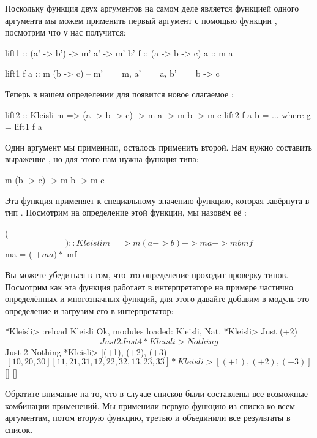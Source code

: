 Поскольку функция двух аргументов на самом деле является функцией одного
аргумента мы можем применить первый аргумент с помощью функции
, посмотрим что у нас получится:


\begin{code}
lift1       :: (a' -> b') -> m' a' -> m' b'
f           :: (a -> b -> c)
a           :: m a

lift1 f a   :: m (b -> c)  -- m' == m, a' == a, b' == b -> c
\end{code}

Теперь в нашем определении для  появится новое слагаемое
:


\begin{code}
lift2 :: Kleisli m => (a -> b -> c) -> m a -> m b -> m c
lift2 f a b = ...
    where g = lift1 f a
\end{code}

Один аргумент мы применили, осталось применить второй. Нам нужно
составить выражение , но для этого нам нужна функция типа:


\begin{code}
m (b -> c) -> m b -> m c
\end{code}

Эта функция применяет к специальному значению функцию, которая завёрнута
в тип . Посмотрим на определение этой функции, мы назовём её
\In{$$}:


\begin{code}
($$) :: Kleisli m => m (a -> b) -> m a -> m b
mf $$ ma = ( +$ ma) *$ mf
\end{code}

Вы можете убедиться в том, что это определение проходит проверку типов.
Посмотрим как эта функция работает в интерпретаторе на примере частично
определённых и многозначных функций, для этого давайте добавим в модуль
 это определение и загрузим его в интерпретатор:


\begin{code}
*Kleisli> :reload Kleisli
Ok, modules loaded: Kleisli, Nat.
*Kleisli> Just (+2) $$ Just 2
Just 4
*Kleisli> Nothing $$ Just 2
Nothing
*Kleisli> [(+1), (+2), (+3)] $$ [10,20,30]
[11,21,31,12,22,32,13,23,33]
*Kleisli> [(+1), (+2), (+3)] $$ []
[]
\end{code}

Обратите внимание на то, что в случае списков были составлены все
возможные комбинации применений. Мы применили первую функцию из списка
ко всем аргументам, потом вторую функцию, третью и объединили все
результаты в список.

